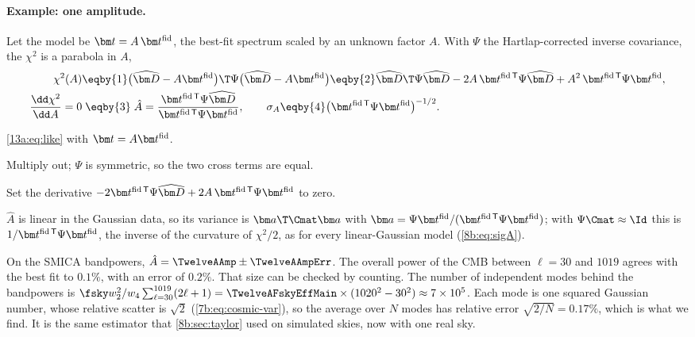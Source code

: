 \paragraph{Example: one amplitude.} Let the model be $\bm t=A\,\bm t^{\rm fid}$, the best-fit spectrum scaled by an
unknown factor $A$. With $\Psi$ the Hartlap-corrected inverse covariance, the $\chi^2$ is a parabola in $A$,
\begin{align}
  \chi^2(A)
  &\eqby{1}\bigl(\widehat{\bm D}-A\bm t^{\rm fid}\bigr)\T\Psi\bigl(\widehat{\bm D}-A\bm t^{\rm fid}\bigr)
   \eqby{2}\widehat{\bm D}\T\Psi\widehat{\bm D}-2A\,\bm t^{\rm fid\,\mathsf T}\Psi\widehat{\bm D}+A^2\,\bm t^{\rm fid\,\mathsf T}\Psi\bm t^{\rm fid},
  \nonumber\\
  \frac{\dd\chi^2}{\dd A}=0
  &\;\eqby{3}\;\hat A=\frac{\bm t^{\rm fid\,\mathsf T}\Psi\widehat{\bm D}}{\bm t^{\rm fid\,\mathsf T}\Psi\bm t^{\rm fid}},
  \qquad
  \sigma_A\eqby{4}\bigl(\bm t^{\rm fid\,\mathsf T}\Psi\bm t^{\rm fid}\bigr)^{-1/2} .
  \label{13a:eq:amp}
\end{align}
\begin{explain}
  \item \eqref{13a:eq:like} with $\bm t=A\bm t^{\rm fid}$.
  \item Multiply out; $\Psi$ is symmetric, so the two cross terms are equal.
  \item Set the derivative $-2\bm t^{\rm fid\,\mathsf T}\Psi\widehat{\bm D}+2A\,\bm t^{\rm fid\,\mathsf T}\Psi\bm t^{\rm fid}$ to zero.
  \item $\hat A$ is linear in the Gaussian data, so its variance is $\bm a\T\Cmat\bm a$ with
        $\bm a=\Psi\bm t^{\rm fid}/(\bm t^{\rm fid\,\mathsf T}\Psi\bm t^{\rm fid})$; with $\Psi\Cmat\approx\Id$ this is
        $1/\bm t^{\rm fid\,\mathsf T}\Psi\bm t^{\rm fid}$, the inverse of the curvature of $\chi^2/2$, as for every
        linear-Gaussian model (\cref{8b:eq:sigA}).
\end{explain}
On the SMICA bandpowers, $\hat A=\TwelveAAmp\pm\TwelveAAmpErr$. The overall power of the CMB between $\ell=30$ and
$1019$ agrees with the best fit to $0.1\%$, with an error of $0.2\%$. That size can be checked by counting. The
number of independent modes behind the bandpowers is $\fsky w_2^2/w_4\sum_{\ell=30}^{1019}(2\ell+1)=
\TwelveAFskyEffMain\times(1020^2-30^2)\approx7\times10^5$. Each mode is one squared Gaussian number, whose relative
scatter is $\sqrt2$ (\cref{7b:eq:cosmic-var}), so the average over $N$ modes has relative error $\sqrt{2/N}=0.17\%$, which is what we find. It is the same estimator that \cref{8b:sec:taylor} used on
simulated skies, now with one real sky.

